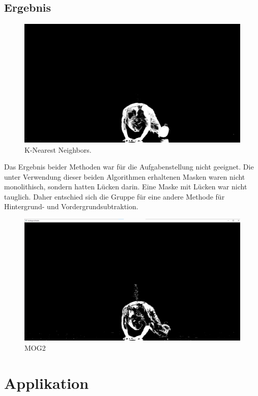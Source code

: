 \documentclass[12pt]{scrartcl}
\begin{document}
\subsection{Ergebnis}
\begin{figure}
  \includegraphics[width=\linewidth]{knn.png}
  \caption{K-Nearest Neighbors.}
  \label{fig:knn}
\end{figure}
Das Ergebnis beider Methoden war f\"ur die Aufgabenstellung nicht geeignet. Die unter Verwendung dieser beiden Algorithmen erhaltenen Masken waren nicht monolithisch, sondern hatten L\"ucken darin. Eine Maske mit L\"ucken war nicht tauglich.
Daher entschied sich die Gruppe f\"ur eine andere Methode f\"ur Hintergrund- und Vordergrundsubtraktion.\\
\begin{figure}
  \includegraphics[width=\linewidth]{mog2.png}
  \caption{MOG2}
  \label{fig:mog2}
\end{figure}

\section{Applikation}
\end{document}
